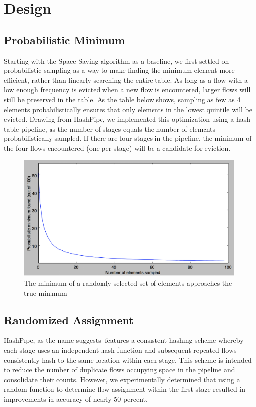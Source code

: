 \section{Design}
\label{sec:design}
\subsection{Probabilistic Minimum}
Starting with the Space Saving algorithm as a baseline, we first settled on probabilistic sampling as a way to make finding the minimum element more efficient, rather than linearly searching the entire table. As long as a flow with a low enough frequency is evicted when a new flow is encountered, larger flows will still be preserved in the table. As the table below shows, sampling as few as 4 elements probabilistically ensures that only elements in the lowest quintile will be evicted. Drawing from HashPipe, we implemented this optimization using a hash table pipeline, as the number of stages equals the number of elements probabilistically sampled. If there are four stages in the pipeline, the minimum of the four flows encountered (one per stage) will be a candidate for eviction. 
\begin{figure}[t]
  \centering
    \includegraphics[scale=0.32]{probMin}
     \caption{The minimum of a randomly selected set of elements approaches the true minimum}
     \label{fig:bp-image}
\end{figure}
\subsection{Randomized Assignment}
HashPipe, as the name suggests, features a consistent hashing scheme whereby each stage uses an independent hash function and subsequent repeated flows consistently hash to the same location within each stage. This scheme is intended to reduce the number of duplicate flows occupying space in the pipeline and consolidate their counts. However, we experimentally determined that using a random function to determine flow assignment within the first stage resulted in improvements in accuracy of nearly 50 percent.
